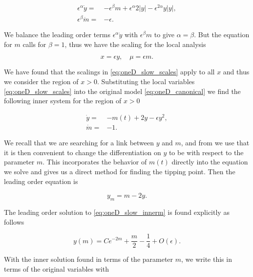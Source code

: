\begin{equation}\label{eq:oneD_slow_scalesearch}
\begin{aligned}
\epsilon^\alpha \dot{y}=&-\epsilon^\beta m +\epsilon^\alpha 2|y|-\epsilon^{2\alpha}y|y|,\\
 \epsilon^\beta \dot{m}=&-\epsilon.
\end{aligned}
\end{equation}

We balance the leading order terms $\epsilon^\alpha\dot{y}$ with $\epsilon^\beta m$ to give $\alpha=\beta$. But the equation for $m$ calls for $\beta=1$, thus we have the scaling for the local analysis

\begin{equation}\label{eq:oneD_slow_scales}
x=\epsilon y,\quad \mu=\epsilon m.
\end{equation}

We have found that the scalings in \eqref{eq:oneD_slow_scales} apply to all $x$ and thus we consider the region of $x>0$. Substituting the local variables \eqref{eq:oneD_slow_scales} into the original model \eqref{eq:oneD_canonical} we find the following inner system for the region of $x>0$

\begin{equation}\label{eq:oneD_slow_innereq}
\begin{aligned}
\dot{y}=&-m(t)+2 y-\epsilon y^2,\\
\dot{m}=&-1.
\end{aligned}
\end{equation}

We recall that we are searching for a link between $y$ and $m$, and from \cite{haberman1979slowly} we use that it is then convenient to change the differentiation on $y$ to be with respect to the parameter $m$. This incorporates the behavior of $m(t)$ directly into the equation we solve and gives us a direct method for finding the tipping point. Then the leading order equation is

\begin{equation}\label{eq:oneD_slow_innerm}
y_m = m-2y.
\end{equation}

The leading order solution to \eqref{eq:oneD_slow_innerm} is found explicitly as follows

\begin{equation*}
y(m) = C e^{-2m}+\frac{m}{2}-\frac{1}{4}+O(\epsilon).
\end{equation*}

With the inner solution found in terms of the parameter $m$, we write this in terms of the original variables with


